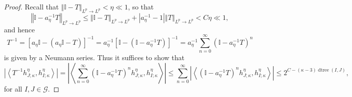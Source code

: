 \documentclass{amsart}%
\theoremstyle{plain}
\numberwithin{equation}{section}
\begin{document}
\begin{proof}
Recall that $\left\Vert \mathbb{I}-T\right\Vert _{L^{p}\rightarrow L^{p}}%
<\eta\ll1$, so that
\[
\left\Vert \mathbb{I}-a_{\eta}^{-1}T\right\Vert _{L^{p}\rightarrow L^{p}}%
\leq\left\Vert \mathbb{I}-T\right\Vert _{L^{p}\rightarrow L^{p}}+\left\vert
a_{\eta}^{-1}-1\right\vert \left\Vert T\right\Vert _{L^{p}\rightarrow L^{p}%
}<C\eta\ll1,
\]
and hence
\[
T^{-1}=\left[  a_{\eta}\mathbb{I}-\left(  a_{\eta}\mathbb{I}-T\right)
\right]  ^{-1}=a_{\eta}^{-1}\left[  \mathbb{I}-\left(  \mathbb{I}-a_{\eta
}^{-1}T\right)  \right]  ^{-1}=a_{\eta}^{-1}\sum_{n=0}^{\infty}\left(
\mathbb{I}-a_{\eta}^{-1}T\right)  ^{n}%
\]
is given by a Neumann series. Thus it suffices to show that
\begin{equation}
\left\vert \left\langle T^{-1}h_{J;\kappa}^{\eta},h_{I;\kappa}^{\eta
}\right\rangle \right\vert =\left\vert \left\langle \sum_{n=0}^{\infty}\left(
\mathbb{I}-a_{\eta}^{-1}T\right)  ^{n}h_{J;\kappa}^{\eta},h_{I;\kappa}^{\eta
}\right\rangle \right\vert \leq\sum_{n=0}^{\infty}\left\vert \left\langle
\left(  \mathbb{I}-a_{\eta}^{-1}T\right)  ^{n}h_{J;\kappa}^{\eta},h_{I;\kappa
}^{\eta}\right\rangle \right\vert \leq2^{C-\left(  \kappa-3\right)
\operatorname*{dtree}\left(  I,J\right)  },\label{suff}%
\end{equation}
for all $I,J\in\mathcal{G}$.


\end{proof}
\end{document}
